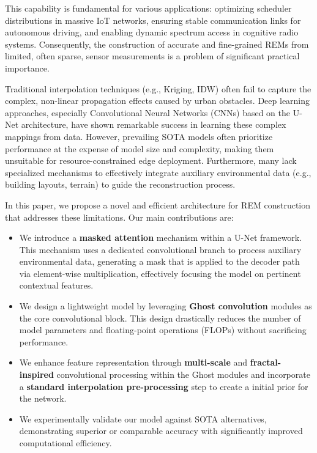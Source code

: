 \documentclass[conference]{IEEEtran}
\begin{document}
This capability is fundamental for various applications: optimizing scheduler distributions in massive 
IoT networks, ensuring stable communication links for autonomous driving, and enabling dynamic spectrum 
access in cognitive radio systems. Consequently, the construction of accurate and fine-grained REMs from 
limited, often sparse, sensor measurements is a problem of significant practical importance.

Traditional interpolation techniques (e.g., Kriging, IDW) often fail to capture the complex, non-linear 
propagation effects caused by urban obstacles. Deep learning approaches, especially Convolutional Neural 
Networks (CNNs) based on the U-Net architecture, have shown remarkable success in learning these complex 
mappings from data. However, prevailing SOTA models often prioritize performance at the expense of model 
size and complexity, making them unsuitable for resource-constrained edge deployment. Furthermore, many 
lack specialized mechanisms to effectively integrate auxiliary environmental data (e.g., building layouts, 
terrain) to guide the reconstruction process.

In this paper, we propose a novel and efficient architecture for REM construction that addresses these 
limitations. Our main contributions are:
\begin{itemize}
    \item We introduce a \textbf{masked attention} mechanism within a U-Net framework. This mechanism uses 
    a dedicated convolutional branch to process auxiliary environmental data, generating a mask that is 
    applied to the decoder path via element-wise multiplication, effectively focusing the model on pertinent 
    contextual features.
    \item We design a lightweight model by leveraging \textbf{Ghost convolution} modules as the core 
    convolutional block. This design drastically reduces the number of model parameters and floating-point 
    operations (FLOPs) without sacrificing performance.
    \item We enhance feature representation through \textbf{multi-scale} and \textbf{fractal-inspired} 
    convolutional processing within the Ghost modules and incorporate a \textbf{standard interpolation 
    pre-processing} step to create a initial prior for the network.
    \item We experimentally validate our model against SOTA alternatives, demonstrating superior or 
    comparable accuracy with significantly improved computational efficiency.
\end{itemize}
\end{document}
